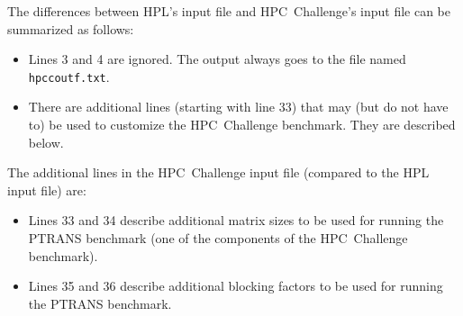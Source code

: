 \documentclass[twocolumn]{article}
\begin{document}
The differences between HPL's input file and HPC~Challenge's input file can
be summarized as follows:

\begin{itemize}
\item Lines 3 and 4 are ignored. The output always goes to the file named \texttt{hpccoutf.txt}.
\item There are additional lines (starting with line 33) that may (but
do not have to) be used to customize the HPC~Challenge benchmark. They
are described below.
\end{itemize}

The additional lines in the HPC~Challenge input file (compared to the
HPL input file) are:

\begin{itemize}
\item Lines 33 and 34 describe additional matrix sizes to be used for
running the PTRANS benchmark (one of the components of the
HPC~Challenge benchmark).
\item Lines 35 and 36 describe additional blocking factors to be used
for running the PTRANS benchmark.
\end{itemize}
\end{document}
